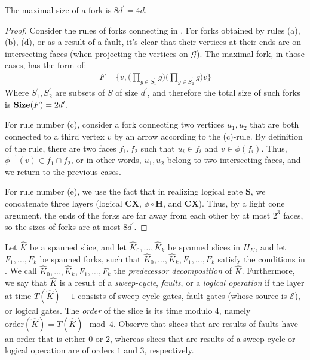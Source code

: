 \begin{claim}
  \label{claim:maxfork}
  The maximal size of a fork is $8d^{\prime} = 4d$.
\end{claim}
\begin{proof}
Consider the rules of forks connecting in . For forks obtained by rules (a), (b), (d), or as a result of a fault, it's clear that their vertices at their ends are on intersecting faces (when projecting the vertices on $\mathcal{G}$). The maximal fork, in those cases, has the form of:
  \begin{equation*}
    \begin{split}
   F =  \bigl\{ v , \bigl( \prod_{g \in S^{\prime}_{1}} g\bigr) \bigl(  \prod_{g \in S^{\prime}_{2}} g \bigr) v    \bigr\}
    \end{split}
  \end{equation*}
  Where $S^{\prime}_{1}, S^{\prime}_{2}$ are subsets of $S$ of size $d^{\prime}$, and therefore the total size of such forks is $\mathbf{Size}(F) = 2d^{\prime}$.
 

  For rule number (c), consider a fork connecting two vertices $u_{1}, u_{2}$ that are both connected to a third vertex $v$ by an arrow according to the (c)-rule. By definition of the rule, there are two faces $f_{1}, f_{2}$ such that $u_{i} \in f_{i}$ and $v \in \phi(f_{i})$. Thus, $\phi^{-1}(v) \in f_{1} \cap f_{2}$, or in other words, $u_{1}, u_{2}$ belong to two intersecting faces, and we return to the previous cases. 


For rule number (e), we use the fact that in realizing logical gate $\mathbf{S}$, we concatenate three layers (logical $\mathbf{CX}$, $\phi \circ \mathbf{H}$, and $\mathbf{CX}$). Thus, by a light cone argument, the ends of the forks are far away from each other by at most $2^{3}$ faces, so the sizes of forks are at most $8d^{\prime}$.
\end{proof}
  \begin{definition}
  Let $\hat{K}$ be a spanned slice, and let $\hat{K}_{0}, \ldots, \hat{K}_{k}$ be spanned slices in $H_{K}$, and let $F_{1}, \ldots, F_{k}$ be spanned forks, such that $\hat{K}_{0}, \ldots, \hat{K}_{k}, F_{1}, \ldots, F_{k}$ satisfy the conditions in . We call $\hat{K}_{0}, \ldots, \hat{K}_{k}, F_{1}, \ldots, F_{k}$ the \textit{predecessor decomposition} of $\hat{K}$.  
Furthermore, we say that $\hat{K}$ is a result of a \textit{sweep-cycle}, \textit{faults}, or a \textit{logical operation} if the layer at time $T(\hat{K}) - 1$ consists of sweep-cycle gates, fault gates (whose source is $\mathcal{E}$), or logical gates. The \textit{order} of the slice is its time modulo $4$, namely $\text{order}(\hat{K}) = T(\hat{K}) \mod 4$. Observe that slices that are results of faults have an order that is either $0$ or $2$, whereas slices that are results of a sweep-cycle or logical operation are of orders $1$ and $3$, respectively.
  \end{definition}


